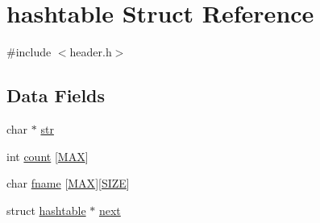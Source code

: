 \hypertarget{structhashtable}{\section{hashtable Struct Reference}
\label{structhashtable}
}


{\ttfamily \#include $<$header.\-h$>$}

\subsection*{Data Fields}
\begin{DoxyCompactItemize}
\item 
char $\ast$ \hyperlink{structhashtable_ab50d783982593ef993ea0b68f7ad8b80}{str}
\item 
int \hyperlink{structhashtable_a6783739354533638166680b34941688e}{count} \mbox{[}\hyperlink{header_8h_a392fb874e547e582e9c66a08a1f23326}{M\-A\-X}\mbox{]}
\item 
char \hyperlink{structhashtable_a67c3266840f809ad8d273fba5a3877e1}{fname} \mbox{[}\hyperlink{header_8h_a392fb874e547e582e9c66a08a1f23326}{M\-A\-X}\mbox{]}\mbox{[}\hyperlink{header_8h_a70ed59adcb4159ac551058053e649640}{S\-I\-Z\-E}\mbox{]}
\item 
struct \hyperlink{structhashtable}{hashtable} $\ast$ \hyperlink{structhashtable_ab92122bd1cbadecf65004ab09fc458ee}{next}
\end{DoxyCompactItemize}


